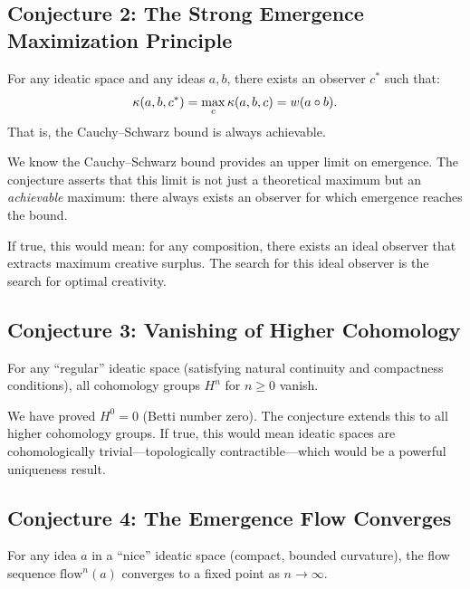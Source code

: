 \subsection{Conjecture 2: The Strong Emergence Maximization Principle}

\begin{conjecture}
\label{conj:strong-max}
For any ideatic space and any ideas $a, b$, there exists an observer $c^*$
such that:
\[
  \kappa(a, b, c^*) = \max_c \kappa(a, b, c) = w(a \circ b).
\]
That is, the Cauchy--Schwarz bound is always achievable.
\end{conjecture}

We know the Cauchy--Schwarz bound provides an upper limit on emergence. The
conjecture asserts that this limit is not just a theoretical maximum but an
\emph{achievable} maximum: there always exists an observer for which emergence
reaches the bound.

If true, this would mean: for any composition, there exists an ideal observer
that extracts maximum creative surplus. The search for this ideal observer is
the search for optimal creativity.

\subsection{Conjecture 3: Vanishing of Higher Cohomology}

\begin{conjecture}
\label{conj:higher-cohom}
For any ``regular'' ideatic space (satisfying natural continuity and compactness
conditions), all cohomology groups $H^n$ for $n \geq 0$ vanish.
\end{conjecture}

We have proved $H^0 = 0$ (Betti number zero). The conjecture extends this to
all higher cohomology groups. If true, this would mean ideatic spaces are
cohomologically trivial---topologically contractible---which would be a
powerful uniqueness result.

\subsection{Conjecture 4: The Emergence Flow Converges}

\begin{conjecture}
\label{conj:flow-converge}
For any idea $a$ in a ``nice'' ideatic space (compact, bounded curvature),
the flow sequence $\text{flow}^n(a)$ converges to a fixed point as $n \to
\infty$.
\end{conjecture}

